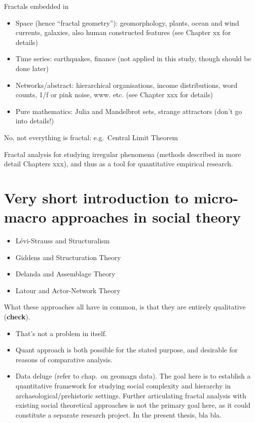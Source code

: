 \documentclass[
  12pt,
]{book}
\begin{document}
Fractals embedded in

\begin{itemize}
\item
  Space (hence ``fractal geometry''): geomorphology, plants, ocean and wind currents, galaxies, also human constructed features (see Chapter xx for details)
\item
  Time series: earthquakes, finance (not applied in this study, though should be done later)
\item
  Networks/abstract: hierarchical organisations, income distributions, word counts, 1/f or pink noise, www. etc. (see Chapter xxx for details)
\item
  Pure mathematics: Julia and Mandelbrot sets, strange attractors (don't go into details!)
\end{itemize}

No, not everything is fractal: e.g.~Central Limit Theorem

Fractal analysis for studying irregular phenomena (methods described in more detail Chapters xxx), and thus as a tool for quantitative empirical research.

\hypertarget{very-short-introduction-to-micro-macro-approaches-in-social-theory}{%
\section{Very short introduction to micro-macro approaches in social theory}\label{very-short-introduction-to-micro-macro-approaches-in-social-theory}}

\begin{itemize}
\item
  Lévi-Strauss and Structuralism
\item
  Giddens and Structuration Theory
\item
  Delanda and Assemblage Theory
\item
  Latour and Actor-Network Theory
\end{itemize}

What these approaches all have in common, is that they are entirely qualitative (\textbf{check}).

\begin{itemize}
\item
  That's not a problem in itself.
\item
  Quant approach is both possible for the stated purpose, and desirable for reasons of comparative analysis.
\item
  Data deluge (refer to chap.~on geomagn data). The goal here is to establish a quantitative framework for studying social complexity and hierarchy in archaeological/prehistoric settings. Further articulating fractal analysis with existing social theoretical approaches is not the primary goal here, as it could constitute a separate research project. In the present thesis, bla bla.
\end{itemize}
\end{document}
